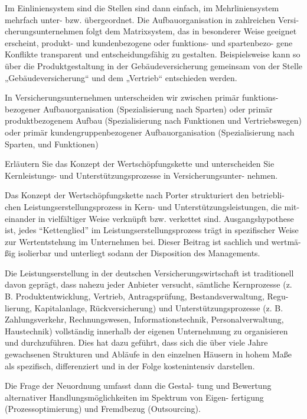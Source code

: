 Im Einliniensystem sind die Stellen sind dann einfach, im Mehrliniensystem
mehrfach unter- bzw. übergeordnet. Die Aufbauorganisation in zahlreichen Versi-
cherungsunternehmen folgt dem Matrixsystem, das in besonderer Weise geeignet erscheint, 
produkt- und kundenbezogene oder funktions- und spartenbezo-
gene Konflikte transparent und entscheidungsfähig zu gestalten. Beispielsweise
kann so über die Produktgestaltung in der Gebäudeversicherung gemeinsam von
der Stelle „Gebäudeversicherung“ und dem „Vertrieb“ entschieden werden.


In Versicherungsunternehmen unterscheiden wir zwischen primär funktions-
bezogener Aufbauorganisation (Spezialisierung nach Sparten) oder primär
produktbezogenem Aufbau (Spezialisierung nach Funktionen und Vertriebswegen)
oder primär kundengruppenbezogener Aufbauorganisation (Spezialisierung nach
Sparten, und Funktionen)




Erläutern Sie das Konzept der Wertschöpfungskette und unterscheiden
Sie Kernleistungs- und Unterstützungsprozesse in Versicherungsunter-
nehmen.

Das Konzept der Wertschöpfungskette nach Porter strukturiert den betriebli-
chen Leistungserstellungsprozess in Kern- und Unterstützungsleistungen, die mit-
einander in vielfältiger Weise verknüpft bzw. verkettet sind. Ausgangshypothese
ist, jedes “Kettenglied” im Leistungserstellungsprozess trägt in spezifischer Weise
zur Wertentstehung im Unternehmen bei. Dieser Beitrag ist sachlich und wertmä-
ßig isolierbar und unterliegt sodann der Disposition des Managements.


Die Leistungserstellung in der deutschen Versicherungswirtschaft ist traditionell
davon geprägt, dass nahezu jeder Anbieter versucht, sämtliche Kernprozesse
(z. B. Produktentwicklung, Vertrieb, Antragsprüfung, Bestandsverwaltung, Regu-
lierung, Kapitalanlage, Rückversicherung) und Unterstützungsprozesse (z. B.
Zahlungsverkehr, Rechnungswesen, Informationstechnik, Personalverwaltung,
Haustechnik) vollständig innerhalb der eigenen Unternehmung zu organisieren und
durchzuführen. Dies hat dazu geführt, dass sich die über viele Jahre gewachsenen
Strukturen und Abläufe in den einzelnen Häusern in hohem Maße als spezifisch,
differenziert und in der Folge kostenintensiv darstellen.

Die Frage der Neuordnung umfasst dann die Gestal-
tung und Bewertung alternativer Handlungsmöglichkeiten im Spektrum von Eigen-
fertigung (Prozessoptimierung) und Fremdbezug (Outsourcing).

